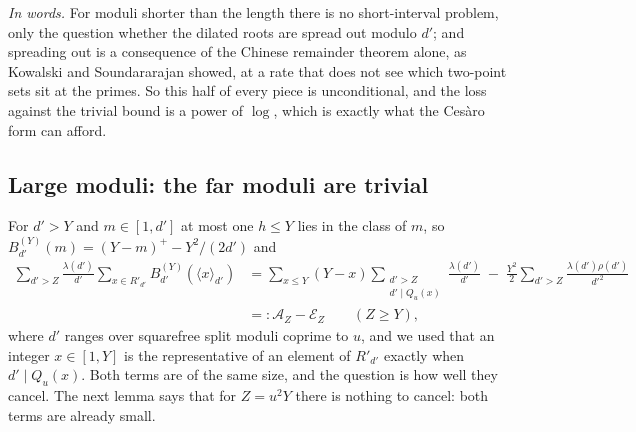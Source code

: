 \documentclass[11pt,a4paper]{article}
\theoremstyle{remark}\newtheorem{remark}[theorem]{Remark}
\newcommand{\rep}[2]{\langle #1\rangle_{#2}}
\begin{document}
\emph{In words.} For moduli shorter than the length there is no short-interval problem, only the question
whether the dilated roots are spread out modulo $d'$; and spreading out is a consequence of the Chinese
remainder theorem alone, as Kowalski and Soundararajan showed, at a rate that does not see which two-point
sets sit at the primes. So this half of every piece is unconditional, and the loss against the trivial bound
is a power of $\log$, which is exactly what the Ces\`aro form can afford.

\subsection{Large moduli: the far moduli are trivial}\label{sec:far}

For $d'>Y$ and $m\in[1,d']$ at most one $h\le Y$ lies in the class of $m$, so $B^{(Y)}_{d'}(m)=(Y-m)^+-Y^2/(2d')$ and
\begin{equation}\label{eq:Pgt}
\begin{split}
\sum_{d'>Z}\frac{\lambda(d')}{d'}\sum_{x\in R'_{d'}}B^{(Y)}_{d'}(\rep x{d'})&=\sum_{x\le Y}(Y-x)\sum_{\substack{d'>Z\\ d'\mid Q_u(x)}}\frac{\lambda(d')}{d'}\;-\;\frac{Y^2}2\sum_{d'>Z}\frac{\lambda(d')\rho(d')}{d'^2}\\
&=:\mathcal A_Z-\mathcal E_Z\qquad(Z\ge Y),
\end{split}
\end{equation}
where $d'$ ranges over squarefree split moduli coprime to $u$, and we used that an integer $x\in[1,Y]$ is the
representative of an element of $R'_{d'}$ exactly when $d'\mid Q_u(x)$. Both terms are of the same size, and
the question is how well they cancel. The next lemma says that for $Z=u^2Y$ there is nothing to cancel: both
terms are already small.
\end{document}
